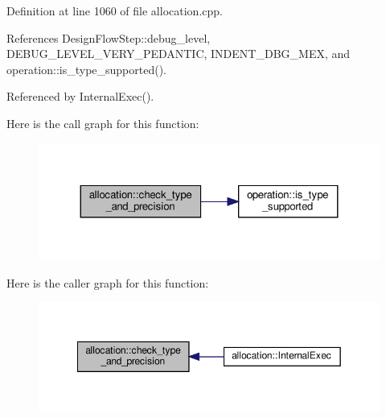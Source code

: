 Definition at line 1060 of file allocation.\+cpp.



References Design\+Flow\+Step\+::debug\+\_\+level, D\+E\+B\+U\+G\+\_\+\+L\+E\+V\+E\+L\+\_\+\+V\+E\+R\+Y\+\_\+\+P\+E\+D\+A\+N\+T\+IC, I\+N\+D\+E\+N\+T\+\_\+\+D\+B\+G\+\_\+\+M\+EX, and operation\+::is\+\_\+type\+\_\+supported().



Referenced by Internal\+Exec().

Here is the call graph for this function\+:
\nopagebreak
\begin{figure}[H]
\begin{center}
\leavevmode
\includegraphics[width=324pt]{d0/d74/classallocation_a92dce6f1c4e5c6c794ef18ed545fc21d_cgraph}
\end{center}
\end{figure}
Here is the caller graph for this function\+:
\nopagebreak
\begin{figure}[H]
\begin{center}
\leavevmode
\includegraphics[width=349pt]{d0/d74/classallocation_a92dce6f1c4e5c6c794ef18ed545fc21d_icgraph}
\end{center}
\end{figure}
\mbox{\label{classallocation_a164671812f520839974efb00b03e79e2}} 

